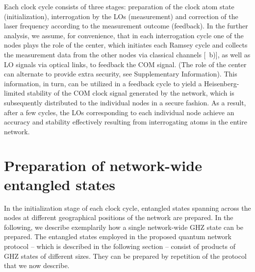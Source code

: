 Each clock cycle consists of three stages: preparation of the clock atom state
(initialization), interrogation by the LOs (measurement) and correction of the
laser frequency according to the measurement outcome (feedback).
In the further analysis, we assume, for convenience, that in each interrogation
cycle one of the nodes plays the role of the center, which initiates
each Ramsey cycle and collects the measurement data from the other nodes via
classical channels [~b)], as well as LO signals via optical links,
 to feedback the COM signal.
(The role of the center can alternate to provide extra security, see
 Supplementary Information). This information, in turn, can be utilized in a feedback cycle to yield a Heisenberg-limited
stability of the COM clock signal generated by the network, which is 
subsequently distributed to the individual nodes in a secure fashion.  As a
result, after a few cycles, the LOs corresponding to each individual node
achieve an accuracy and stability effectively resulting from interrogating atoms
in the entire network.



\section{Preparation of network-wide entangled states}
\label{sec:NWES}

In the initialization stage of each clock cycle, entangled states spanning
across the nodes at different geographical positions of the network are
prepared. In the following, we describe exemplarily how a single network-wide
GHZ state can be prepared. 
The entangled states employed in the proposed quantum network protocol -- which
is described in the following section -- consist of products of GHZ states of
different sizes. They can be prepared by repetition of the protocol that
we now describe.

